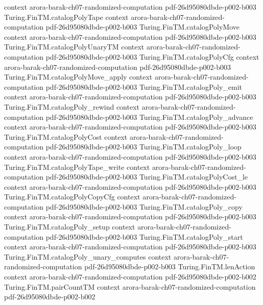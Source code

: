 \begin{theorem}
  {context}
  {arora-barak-ch07-randomized-computation}
  {pdf-26d95080dbde-p002-b003}
\proofstep
  {Turing.FinTM.catalogPolyTape}
  {context}
  {arora-barak-ch07-randomized-computation}
  {pdf-26d95080dbde-p002-b003}
\proofstep
  {Turing.FinTM.catalogPolyMove}
  {context}
  {arora-barak-ch07-randomized-computation}
  {pdf-26d95080dbde-p002-b003}
\proofstep
  {Turing.FinTM.catalogPolyUnaryTM}
  {context}
  {arora-barak-ch07-randomized-computation}
  {pdf-26d95080dbde-p002-b003}
\proofstep
  {Turing.FinTM.catalogPolyCfg}
  {context}
  {arora-barak-ch07-randomized-computation}
  {pdf-26d95080dbde-p002-b003}
\proofstep
  {Turing.FinTM.catalogPolyMove_apply}
  {context}
  {arora-barak-ch07-randomized-computation}
  {pdf-26d95080dbde-p002-b003}
\proofstep
  {Turing.FinTM.catalogPoly_emit}
  {context}
  {arora-barak-ch07-randomized-computation}
  {pdf-26d95080dbde-p002-b003}
\proofstep
  {Turing.FinTM.catalogPoly_rewind}
  {context}
  {arora-barak-ch07-randomized-computation}
  {pdf-26d95080dbde-p002-b003}
\proofstep
  {Turing.FinTM.catalogPoly_advance}
  {context}
  {arora-barak-ch07-randomized-computation}
  {pdf-26d95080dbde-p002-b003}
\proofstep
  {Turing.FinTM.catalogPolyCost}
  {context}
  {arora-barak-ch07-randomized-computation}
  {pdf-26d95080dbde-p002-b003}
\proofstep
  {Turing.FinTM.catalogPoly_loop}
  {context}
  {arora-barak-ch07-randomized-computation}
  {pdf-26d95080dbde-p002-b003}
\proofstep
  {Turing.FinTM.catalogPolyTape_write}
  {context}
  {arora-barak-ch07-randomized-computation}
  {pdf-26d95080dbde-p002-b003}
\proofstep
  {Turing.FinTM.catalogPolyCost_le}
  {context}
  {arora-barak-ch07-randomized-computation}
  {pdf-26d95080dbde-p002-b003}
\proofstep
  {Turing.FinTM.catalogPolyCopyCfg}
  {context}
  {arora-barak-ch07-randomized-computation}
  {pdf-26d95080dbde-p002-b003}
\proofstep
  {Turing.FinTM.catalogPoly_copy}
  {context}
  {arora-barak-ch07-randomized-computation}
  {pdf-26d95080dbde-p002-b003}
\proofstep
  {Turing.FinTM.catalogPoly_setup}
  {context}
  {arora-barak-ch07-randomized-computation}
  {pdf-26d95080dbde-p002-b003}
\proofstep
  {Turing.FinTM.catalogPoly_start}
  {context}
  {arora-barak-ch07-randomized-computation}
  {pdf-26d95080dbde-p002-b003}
\proofstep
  {Turing.FinTM.catalogPoly_unary_computes}
  {context}
  {arora-barak-ch07-randomized-computation}
  {pdf-26d95080dbde-p002-b003}
\proofstep
  {Turing.FinTM.lenAction}
  {context}
  {arora-barak-ch07-randomized-computation}
  {pdf-26d95080dbde-p002-b002}
\proofstep
  {Turing.FinTM.pairCountTM}
  {context}
  {arora-barak-ch07-randomized-computation}
  {pdf-26d95080dbde-p002-b002}

\end{theorem}
